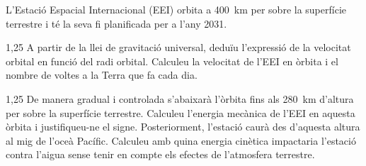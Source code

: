L'Estació Espacial Internacional (EEI) orbita a 400~km per sobre la superfície terrestre i té la seva fi planificada per a l'any 2031.

\begin{apartat}{1,25}
A partir de la llei de gravitació universal, deduïu l'expressió de la velocitat orbital en funció del radi orbital. Calculeu la velocitat de l'EEI en òrbita i el nombre de voltes a la Terra que fa cada dia.
\end{apartat}

\begin{apartat}{1,25}
De manera gradual i controlada s'abaixarà l'òrbita fins als 280~km d'altura per sobre la superfície terrestre. Calculeu l'energia mecànica de l'EEI en aquesta òrbita i justifiqueu-ne el signe. Posteriorment, l'estació caurà des d'aquesta altura al mig de l'oceà Pacífic. Calculeu amb quina energia cinètica impactaria l'estació contra l'aigua sense tenir en compte els efectes de l'atmosfera terrestre.
\end{apartat}

